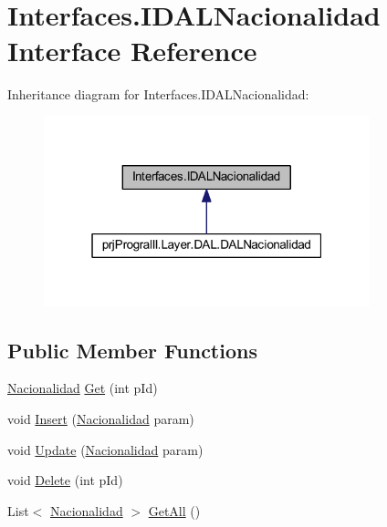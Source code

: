 \hypertarget{interface_interfaces_1_1_i_d_a_l_nacionalidad}{}\section{Interfaces.\+I\+D\+A\+L\+Nacionalidad Interface Reference}
\label{interface_interfaces_1_1_i_d_a_l_nacionalidad}


Inheritance diagram for Interfaces.\+I\+D\+A\+L\+Nacionalidad\+:
\nopagebreak
\begin{figure}[H]
\begin{center}
\leavevmode
\includegraphics[width=268pt]{interface_interfaces_1_1_i_d_a_l_nacionalidad__inherit__graph}
\end{center}
\end{figure}
\subsection*{Public Member Functions}
\begin{DoxyCompactItemize}
\item 
\hyperlink{classprj_progra_i_i_i_1_1_layer_1_1_entities_1_1_nacionalidad}{Nacionalidad} \hyperlink{interface_interfaces_1_1_i_d_a_l_nacionalidad_a1a283052260a80ed1d3a94d2e1dc520e}{Get} (int p\+Id)
\item 
void \hyperlink{interface_interfaces_1_1_i_d_a_l_nacionalidad_ac11f146d5f5b2a50ef33998088a93fef}{Insert} (\hyperlink{classprj_progra_i_i_i_1_1_layer_1_1_entities_1_1_nacionalidad}{Nacionalidad} param)
\item 
void \hyperlink{interface_interfaces_1_1_i_d_a_l_nacionalidad_ac0258a3e5e7bd4ea6a212ad5acf513da}{Update} (\hyperlink{classprj_progra_i_i_i_1_1_layer_1_1_entities_1_1_nacionalidad}{Nacionalidad} param)
\item 
void \hyperlink{interface_interfaces_1_1_i_d_a_l_nacionalidad_ab50e49973f4bce541e8a39d9f5b344bd}{Delete} (int p\+Id)
\item 
List$<$ \hyperlink{classprj_progra_i_i_i_1_1_layer_1_1_entities_1_1_nacionalidad}{Nacionalidad} $>$ \hyperlink{interface_interfaces_1_1_i_d_a_l_nacionalidad_a9c4069ad5642445a09d011062b91c9f5}{Get\+All} ()
\end{DoxyCompactItemize}


